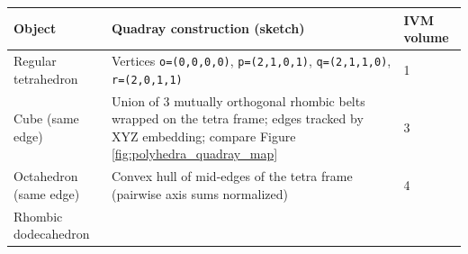 \documentclass[
  10pt,
]{article}
\begin{document}
\begin{longtable}[]{@{}lll@{}}
\toprule
\begin{minipage}[b]{0.30\columnwidth}\raggedright
Object\strut
\end{minipage} & \begin{minipage}[b]{0.30\columnwidth}\raggedright
Quadray construction (sketch)\strut
\end{minipage} & \begin{minipage}[b]{0.30\columnwidth}\raggedright
IVM volume\strut
\end{minipage}\tabularnewline
\midrule
\endhead
\begin{minipage}[t]{0.30\columnwidth}\raggedright
Regular tetrahedron\strut
\end{minipage} & \begin{minipage}[t]{0.30\columnwidth}\raggedright
Vertices \texttt{o=(0,0,0,0)}, \texttt{p=(2,1,0,1)},
\texttt{q=(2,1,1,0)}, \texttt{r=(2,0,1,1)}\strut
\end{minipage} & \begin{minipage}[t]{0.30\columnwidth}\raggedright
1\strut
\end{minipage}\tabularnewline
\begin{minipage}[t]{0.30\columnwidth}\raggedright
Cube (same edge)\strut
\end{minipage} & \begin{minipage}[t]{0.30\columnwidth}\raggedright
Union of 3 mutually orthogonal rhombic belts wrapped on the tetra frame;
edges tracked by XYZ embedding; compare Figure
\ref{fig:polyhedra_quadray_map}\strut
\end{minipage} & \begin{minipage}[t]{0.30\columnwidth}\raggedright
3\strut
\end{minipage}\tabularnewline
\begin{minipage}[t]{0.30\columnwidth}\raggedright
Octahedron (same edge)\strut
\end{minipage} & \begin{minipage}[t]{0.30\columnwidth}\raggedright
Convex hull of mid-edges of the tetra frame (pairwise axis sums
normalized)\strut
\end{minipage} & \begin{minipage}[t]{0.30\columnwidth}\raggedright
4\strut
\end{minipage}\tabularnewline
\begin{minipage}[t]{0.30\columnwidth}\raggedright
Rhombic dodecahedron\strut
\end{minipage} & \begin{minipage}[t]{0.30\columnwidth}\raggedright

\end{minipage}
\end{longtable}
\end{document}
